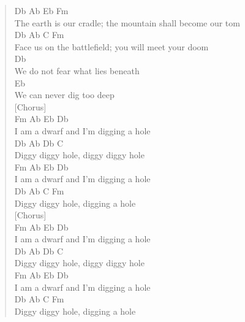 \documentclass[11pt]{article}
\begin{document}
\begin{verse}
\vspace*{1em}
Db         Ab              Eb                Fm\\
The earth is our cradle; the mountain shall become our tom\\
\vspace*{1em}
Db              Ab               C              Fm\\
Face us on the battlefield; you will meet your doom\\
\vspace*{1em}
Db\\
We do not fear what lies beneath\\
\vspace*{1em}
Eb\\
We can never dig too deep\\
\vspace*{1em}
\vspace*{1em}
[Chorus]\\
Fm     Ab            Eb      Db\\
I am a dwarf and I'm digging a hole\\
\vspace*{1em}
Db         Ab   Db          C\\
Diggy diggy hole, diggy diggy hole\\
\vspace*{1em}
Fm     Ab           Eb       Db\\
I am a dwarf and I'm digging a hole\\
\vspace*{1em}
Db         Ab    C        Fm\\
Diggy diggy hole, digging a hole\\
\vspace*{1em}
[Chorus]\\
Fm     Ab            Eb      Db\\
I am a dwarf and I'm digging a hole\\
\vspace*{1em}
Db         Ab   Db          C\\
Diggy diggy hole, diggy diggy hole\\
\vspace*{1em}
Fm     Ab           Eb       Db\\
I am a dwarf and I'm digging a hole\\
\vspace*{1em}
Db         Ab    C        Fm\\
Diggy diggy hole, digging a hole\\

\end{verse}
\end{document}
